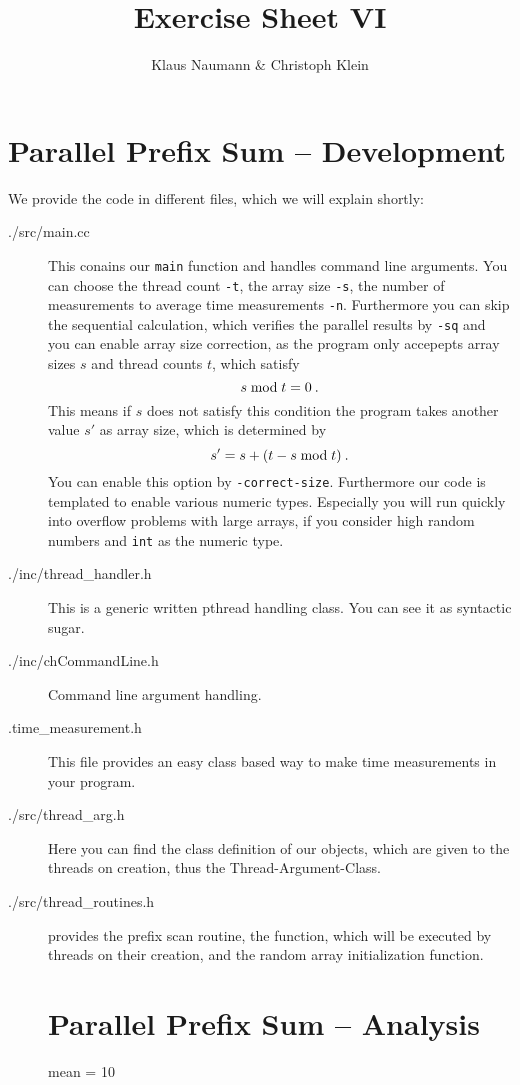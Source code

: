 \documentclass[oneside,a4paper]{scrartcl}
\begin{document}

\title{Exercise Sheet VI}
\subject{Advanced Parallel Computing}
\author{Klaus Naumann \& Christoph Klein}
\maketitle



\section{Parallel Prefix Sum -- Development}

We provide the code in different files, which we will explain shortly:
\begin{description}
	\item[./src/main.cc] This conains our \texttt{main} function and handles
	command line arguments. You can choose the thread count \texttt{-t},
	the array size \texttt{-s}, the number of measurements to average
	time measurements \texttt{-n}. Furthermore you can skip the 
	sequential calculation, which verifies the parallel results by
	\texttt{-sq} and you can enable array size correction, as the
	program only accepepts array sizes $s$ and thread counts $t$, which
	satisfy
	\[s \;\textnormal{mod}\; t = 0\:.\]
	This means if $s$ does not satisfy this condition the program
	takes another value $s'$ as array size, which is determined by
	\[ s' = s + (t - s\;\textnormal{mod}\; t)\:.\]
	You can enable this option by \texttt{-correct-size}. Furthermore
	our code is templated to enable various numeric types. Especially
	you will run quickly into overflow problems with large arrays, if you
	consider high random numbers and \texttt{int} as the numeric type.
	\item[./inc/thread\_handler.h] This is a generic written
	pthread handling class. You can see it as syntactic sugar.
	\item[./inc/chCommandLine.h] Command line argument handling.
	\item[.time\_measurement.h] This file provides an easy class based way
	to make time measurements in your program.
	\item[./src/thread\_arg.h] Here you can find the class definition of
	our objects, which are given to the threads on creation, thus the
	Thread-Argument-Class.
	\item[./src/thread\_routines.h] provides the prefix scan routine,
	the function, which will be executed by threads on their creation,
	and the random array initialization function.

\section{Parallel Prefix Sum -- Analysis}
mean = 10

\end{description}
\end{document}
